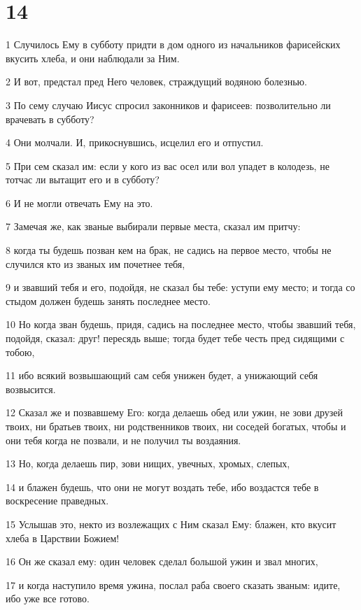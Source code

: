 \chapter{14}

\par 1 Случилось Ему в субботу придти в дом одного из начальников фарисейских вкусить хлеба, и они наблюдали за Ним.
\par 2 И вот, предстал пред Него человек, страждущий водяною болезнью.
\par 3 По сему случаю Иисус спросил законников и фарисеев: позволительно ли врачевать в субботу?
\par 4 Они молчали. И, прикоснувшись, исцелил его и отпустил.
\par 5 При сем сказал им: если у кого из вас осел или вол упадет в колодезь, не тотчас ли вытащит его и в субботу?
\par 6 И не могли отвечать Ему на это.
\par 7 Замечая же, как званые выбирали первые места, сказал им притчу:
\par 8 когда ты будешь позван кем на брак, не садись на первое место, чтобы не случился кто из званых им почетнее тебя,
\par 9 и звавший тебя и его, подойдя, не сказал бы тебе: уступи ему место; и тогда со стыдом должен будешь занять последнее место.
\par 10 Но когда зван будешь, придя, садись на последнее место, чтобы звавший тебя, подойдя, сказал: друг! пересядь выше; тогда будет тебе честь пред сидящими с тобою,
\par 11 ибо всякий возвышающий сам себя унижен будет, а унижающий себя возвысится.
\par 12 Сказал же и позвавшему Его: когда делаешь обед или ужин, не зови друзей твоих, ни братьев твоих, ни родственников твоих, ни соседей богатых, чтобы и они тебя когда не позвали, и не получил ты воздаяния.
\par 13 Но, когда делаешь пир, зови нищих, увечных, хромых, слепых,
\par 14 и блажен будешь, что они не могут воздать тебе, ибо воздастся тебе в воскресение праведных.
\par 15 Услышав это, некто из возлежащих с Ним сказал Ему: блажен, кто вкусит хлеба в Царствии Божием!
\par 16 Он же сказал ему: один человек сделал большой ужин и звал многих,
\par 17 и когда наступило время ужина, послал раба своего сказать званым: идите, ибо уже все готово.
